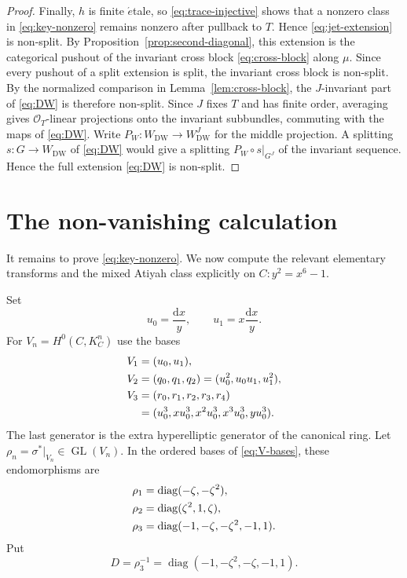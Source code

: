 \documentclass[11pt,a4paper,dvipsnames]{amsart}
\numberwithin{equation}{section}
\theoremstyle{plain}
\theoremstyle{definition}
\newcommand{\cO}{\mathcal O}
\newcommand{\dd}{\mathrm d}
\begin{document}
\begin{proof}
Finally, $h$ is finite $\acute{e}$tale, so
\eqref{eq:trace-injective} shows that a nonzero class in
\eqref{eq:key-nonzero} remains nonzero after pullback to $T$.  Hence
\eqref{eq:jet-extension} is non-split.  By
Proposition~\ref{prop:second-diagonal}, this extension is the categorical pushout of
the invariant cross block \eqref{eq:cross-block} along $\mu$.  Since every
pushout of a split extension is split, the invariant cross block is
non-split.  By the normalized comparison in Lemma~\ref{lem:cross-block},
the $J$-invariant part of \eqref{eq:DW} is therefore non-split.
Since $J$ fixes $T$ and has finite order, averaging gives
$\cO_T$-linear projections onto the invariant subbundles, commuting
with the maps of \eqref{eq:DW}.  Write
$P_W:W_{\mathrm{DW}}\to W_{\mathrm{DW}}^J$ for the middle projection.
A splitting $s:G\to W_{\mathrm{DW}}$ of \eqref{eq:DW} would give a
splitting $P_W\circ s|_{G^J}$ of the invariant sequence.
Hence the full extension \eqref{eq:DW} is non-split.

\end{proof}

\section{The non-vanishing calculation} \label{calculation}

It remains to prove \eqref{eq:key-nonzero}.  We now compute the relevant
elementary transforms and the mixed Atiyah class explicitly on
$C:y^2=x^6-1$.

Set
\begin{equation}\label{eq:u-basis}
 u_0=\frac{\dd x}{y},
 \qquad
 u_1=x\frac{\dd x}{y}.
\end{equation}
For $V_n=H^0(C,K_C^n)$ use the bases
\begin{align}
 V_1&=(u_0,u_1),\notag\\
 V_2&=(q_0,q_1,q_2)=(u_0^2,u_0u_1,u_1^2),\notag\\
 V_3&=(r_0,r_1,r_2,r_3,r_4)\notag\\
    &=(u_0^3,xu_0^3,x^2u_0^3,x^3u_0^3,yu_0^3).
\label{eq:V-bases}
\end{align}
The last generator is the extra hyperelliptic generator of the canonical
ring.  Let
$\rho_n=\sigma^*|_{V_n}\in\operatorname{GL}(V_n)$.  In the ordered bases
of \eqref{eq:V-bases}, these endomorphisms are
\begin{align}
 \rho_1&=\operatorname{diag}(-\zeta,-\zeta^2),\notag\\
 \rho_2&=\operatorname{diag}(\zeta^2,1,\zeta),\notag\\
 \rho_3&=\operatorname{diag}(-1,-\zeta,-\zeta^2,-1,1).
\label{eq:rho-matrices}
\end{align}
Put
\begin{equation}\label{eq:D}
 D=\rho_3^{-1}=\operatorname{diag}(-1,-\zeta^2,-\zeta,-1,1).
\end{equation}
\end{document}
